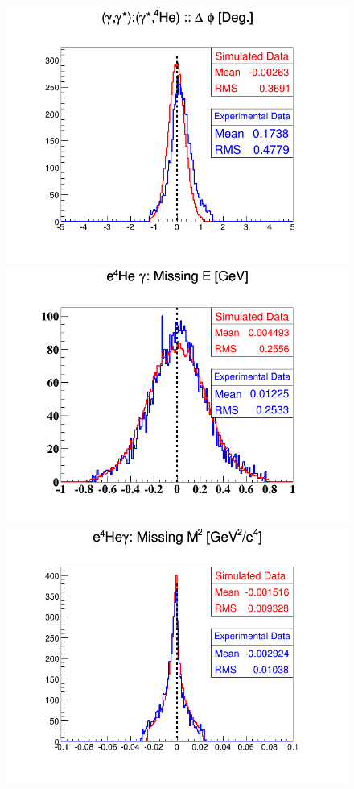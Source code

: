 \begin{figure}[h!]
\includegraphics[scale=0.36]{fig_dvcs/comp/Coh_delta_phi.png}
\includegraphics[scale=0.36]{fig_dvcs/comp/Coh_e4Hegamma_E_Mis.png}
\includegraphics[scale=0.36]{fig_dvcs/comp/Coh_e4Hegamma_M2_Mis.png}

\end{figure}
